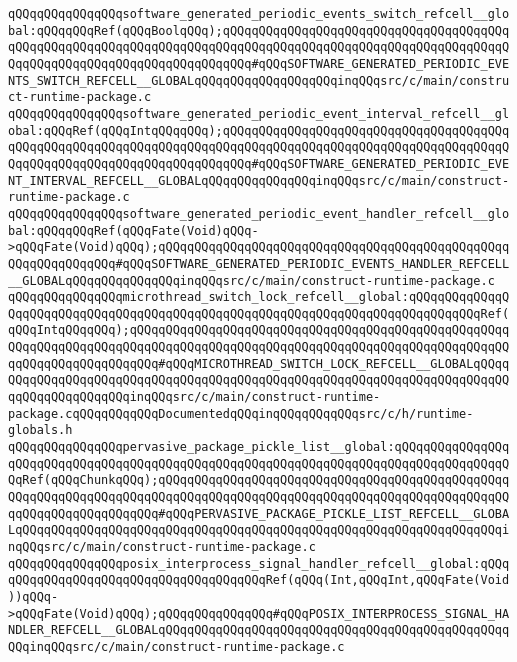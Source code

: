 \verb|qQQqqQQqqQQqqQQqsoftware_generated_periodic_events_switch_refcell__global:qQQqqQQqRef(qQQqBoolqQQq);qQQqqQQqqQQqqQQqqQQqqQQqqQQqqQQqqQQqqQQqqQQqqQQqqQQqqQQqqQQqqQQqqQQqqQQqqQQqqQQqqQQqqQQqqQQqqQQqqQQqqQQqqQQqqQQqqQQqqQQqqQQqqQQqqQQqqQQqqQQqqQQq#qQQqSOFTWARE_GENERATED_PERIODIC_EVENTS_SWITCH_REFCELL__GLOBALqQQqqQQqqQQqqQQqqQQqinqQQqsrc/c/main/construct-runtime-package.c|\newline
\verb|qQQqqQQqqQQqqQQqsoftware_generated_periodic_event_interval_refcell__global:qQQqRef(qQQqIntqQQqqQQq);qQQqqQQqqQQqqQQqqQQqqQQqqQQqqQQqqQQqqQQqqQQqqQQqqQQqqQQqqQQqqQQqqQQqqQQqqQQqqQQqqQQqqQQqqQQqqQQqqQQqqQQqqQQqqQQqqQQqqQQqqQQqqQQqqQQqqQQqqQQqqQQq#qQQqSOFTWARE_GENERATED_PERIODIC_EVENT_INTERVAL_REFCELL__GLOBALqQQqqQQqqQQqqQQqinqQQqsrc/c/main/construct-runtime-package.c|\newline
\verb|qQQqqQQqqQQqqQQqsoftware_generated_periodic_event_handler_refcell__global:qQQqqQQqRef(qQQqFate(Void)qQQq->qQQqFate(Void)qQQq);qQQqqQQqqQQqqQQqqQQqqQQqqQQqqQQqqQQqqQQqqQQqqQQqqQQqqQQqqQQqqQQq#qQQqSOFTWARE_GENERATED_PERIODIC_EVENTS_HANDLER_REFCELL__GLOBALqQQqqQQqqQQqqQQqinqQQqsrc/c/main/construct-runtime-package.c|\newline
\verb|qQQqqQQqqQQqqQQqmicrothread_switch_lock_refcell__global:qQQqqQQqqQQqqQQqqQQqqQQqqQQqqQQqqQQqqQQqqQQqqQQqqQQqqQQqqQQqqQQqqQQqqQQqqQQqqQQqRef(qQQqIntqQQqqQQq);qQQqqQQqqQQqqQQqqQQqqQQqqQQqqQQqqQQqqQQqqQQqqQQqqQQqqQQqqQQqqQQqqQQqqQQqqQQqqQQqqQQqqQQqqQQqqQQqqQQqqQQqqQQqqQQqqQQqqQQqqQQqqQQqqQQqqQQqqQQqqQQq#qQQqMICROTHREAD_SWITCH_LOCK_REFCELL__GLOBALqQQqqQQqqQQqqQQqqQQqqQQqqQQqqQQqqQQqqQQqqQQqqQQqqQQqqQQqqQQqqQQqqQQqqQQqqQQqqQQqqQQqqQQqqQQqinqQQqsrc/c/main/construct-runtime-package.cqQQqqQQqqQQqDocumentedqQQqinqQQqqQQqqQQqsrc/c/h/runtime-globals.h|\newline
\verb|qQQqqQQqqQQqqQQqpervasive_package_pickle_list__global:qQQqqQQqqQQqqQQqqQQqqQQqqQQqqQQqqQQqqQQqqQQqqQQqqQQqqQQqqQQqqQQqqQQqqQQqqQQqqQQqqQQqqQQqRef(qQQqChunkqQQq);qQQqqQQqqQQqqQQqqQQqqQQqqQQqqQQqqQQqqQQqqQQqqQQqqQQqqQQqqQQqqQQqqQQqqQQqqQQqqQQqqQQqqQQqqQQqqQQqqQQqqQQqqQQqqQQqqQQqqQQqqQQqqQQqqQQqqQQqqQQq#qQQqPERVASIVE_PACKAGE_PICKLE_LIST_REFCELL__GLOBALqQQqqQQqqQQqqQQqqQQqqQQqqQQqqQQqqQQqqQQqqQQqqQQqqQQqqQQqqQQqqQQqqQQqinqQQqsrc/c/main/construct-runtime-package.c|\newline
\verb|qQQqqQQqqQQqqQQqposix_interprocess_signal_handler_refcell__global:qQQqqQQqqQQqqQQqqQQqqQQqqQQqqQQqqQQqqQQqRef(qQQq(Int,qQQqInt,qQQqFate(Void))qQQq->qQQqFate(Void)qQQq);qQQqqQQqqQQqqQQq#qQQqPOSIX_INTERPROCESS_SIGNAL_HANDLER_REFCELL__GLOBALqQQqqQQqqQQqqQQqqQQqqQQqqQQqqQQqqQQqqQQqqQQqqQQqqQQqinqQQqsrc/c/main/construct-runtime-package.c|\newline
